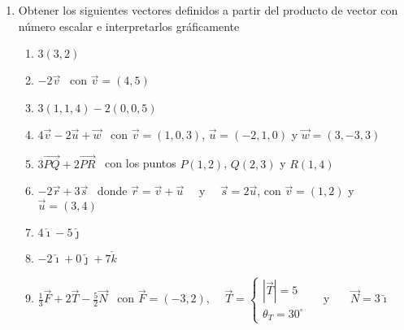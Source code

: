 \documentclass[a4paper]{article}
\newcommand{\exercise}{\item}
\newcommand{\SEL}[1]{ \left\{\begin{matrix} #1 \end{matrix}\right. }
\newcommand{\df}[2]{\displaystyle\frac{#1}{#2}}
\newcommand{\vect}[1]{\overrightarrow{#1}}
\newcommand{\degs}{^{\circ}}
\begin{document}
\begin{enumerate}
\begin{enumerate} [label=(\alph*)]
		\item Dados $\vec{a},\vec{b}$ en $\mathbb{R}^2$, se sabe que $\vec{a}+\vec{b}=(5,4)$ y que $\vec{a}-\vec{b}=(1,-2)$. Calcular $\vec{a}$ y $\vec{b}$ y comprobar el resultado gráficamente.
		\item Determinar $D$ para que $\vect{AB}$ sea equivalente a $\vect{CD}$ con $A(5,-1,3)$, $B(2,3,-2)$, $C(-5,8,-5)$. Interpretar gráficamente.
		\item Encontrar las coordenadas del punto medio entre $A(7,5)$ y $B(1,2)$
		\item Encontrar las coordenadas el punto medio entre $M(0,-1,1)$ y $N(2,2,-1)$
		\item Sean $A(2,-3)$, $B(-3,5)$ y $C(-1,5)$ y $D$ los vértices de un paralelogramo, donde $D$ es el vértice opuesto a $A$, hallar $D$ e interpretar geométricamente.
		\item Dado el vector $\vec{v}=(k,k+1)$, calcular $k$ para que $|\vec{v}|=5$ y dar las coordenadas del vector $\vec{v}$.
		\item Hallar el vector $\vec{v}_{\theta}$ de $\mathbb{R}^2$ que tiene módulo $1$ y ángulo $\theta$. Luego, calcular $\vec{v}_{30 \degs}$, $\vec{v}_{60 \degs}$, $\vec{v}_{90 \degs}$, $\vec{v}_{135 \degs}$ y $\vec{v}_{300 \degs}$.
	\end{enumerate}
	\exercise Obtener los siguientes vectores definidos a partir del producto de vector con número escalar e interpretarlos gráficamente
	\begin{enumerate} [label=(\alph*)]
		\item $3 (3,2)$
		\item $-2 \vec{v}$ ~con $\vec{v}=(4,5)$
		\item $3 (1,1,4) - 2(0,0,5)$
		\item $4 \vec{v} -2 \vec{u} + \vec{w}$ ~con $\vec{v}=(1,0,3)$, $\vec{u}=(-2,1,0)$ y $\vec{w}=(3,-3,3)$
		\item $3 \vect{PQ} + 2 \vect{PR}$ ~con los puntos $P(1,2)$, $Q(2,3)$ y $R(1,4)$
		\item $-2 \vec{r} + 3 \vec{s}$ ~donde $\vec{r}=\vec{v}+\vec{u}$ ~~y~~ $\vec{s}=2\vec{u}$, con $\vec{v}=(1,2)$ y $\vec{u}=(3,4)$
		\item $4 \check{\imath} - 5 \check{\jmath}$
		\item $-2 \check{\imath} +0 \check{\jmath} + 7 \check{k}$
		\item $\df{1}{3} \vect{F} + 2\vect{T} - \df{5}{2}\vect{N}$ ~con $\vect{F}=(-3,2)$,~~ $\vect{T}=\SEL{ |\vect{T}| = 5 \\ \theta_T = 30\degs}$ ~~y~~~ $\vect{N}=3\check{\imath}$

\end{enumerate}
\end{enumerate}
\end{document}
